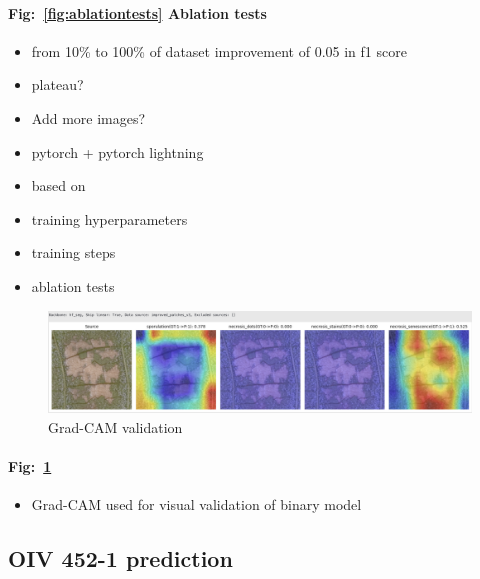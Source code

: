 \documentclass[english]{article}
\begin{document}
\paragraph{Fig:~\ref{fig:ablationtests} Ablation tests}
\begin{itemize}
	\item from 10\% to 100\% of dataset improvement of 0.05 in f1 score
	\item plateau?
	\item Add more images?
\end{itemize}

\begin{itemize}
	\item pytorch + pytorch lightning
	\item based on~\parencite{dosovitskiyImageWorth16x162021}
	\item training hyperparameters
	\item training steps
	\item ablation tests
\end{itemize}

\begin{figure}[H]
	\centering
	\includegraphics[width=0.8\linewidth]{gc_hf_seg_sen_high.png}
	\caption{Grad-CAM validation}\label{fig:gradcamval}
\end{figure}

\paragraph{Fig:~\ref{fig:gradcamval}}
\begin{itemize}
	\item Grad-CAM used for visual validation of binary model
\end{itemize}

\subsection{OIV 452-1 prediction}
\end{document}
